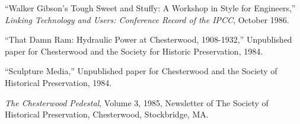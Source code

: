 \documentclass{res}
\begin{document}
\begin{resume}
``Walker Gibson's Tough Sweet and Stuffy: A Workshop in Style for 
Engineers,'' {\it Linking Technology and Users: Conference Record of 
the IPCC}, October 1986. 
 
``That Damn Ram: Hydraulic Power at Chesterwood, 1908-1932,'' 
Unpublished paper for Chesterwood and the Society for Historic 
Preservation, 1984. 
 
``Sculpture Media,'' Unpublished paper for Chesterwood and the 
Society of Historical Preservation, 1984. 
 
{\it The Chesterwood Pedestal}, Volume 3, 1985, Newsletter of The 
Society of Historical Preservation, Chesterwood, Stockbridge, MA. 
 
\end{resume}
\end{document}
